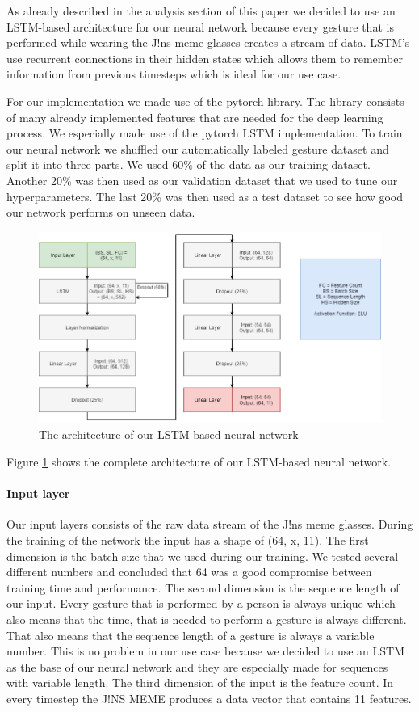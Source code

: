 \documentclass[runningheads]{llncs}
\begin{document}
As already described in the analysis section of this paper we decided to use an LSTM-based architecture for our neural network because every gesture that is performed while wearing the J!ns meme glasses creates a stream of data. LSTM's use recurrent connections in their hidden states which allows them to remember information from previous timesteps which is ideal for our use case.
\par
For our implementation we made use of the pytorch library. The library consists of many already implemented features that are needed for the deep learning process. We especially made use of the pytorch LSTM implementation. To train our neural network we shuffled our automatically labeled gesture dataset and split it into three parts. We used 60\% of the data as our training dataset. Another 20\% was then used as our validation dataset that we used to tune our hyperparameters. The last 20\% was then used as a test dataset to see how good our network performs on unseen data.
\begin{figure}
\centering
\includegraphics[width=\textwidth]{LSTM_Architecture.png}
\caption{The architecture of our LSTM-based neural network}
\label{fig:lstmarchitecture}
\end{figure}
Figure \ref{fig:lstmarchitecture} shows the complete architecture of our LSTM-based neural network.
\paragraph{Input layer}
Our input layers consists of the raw data stream of the J!ns meme glasses. During the training of the network the input has a shape of (64, x, 11). The first dimension is the batch size that we used during our training. We tested several different numbers and concluded that 64 was a good compromise between training time and performance. The second dimension is the sequence length of our input. Every gesture that is performed by a person is always unique which also means that the time, that is needed to perform a gesture is always different. That also means that the sequence length of a gesture is always a variable number. This is no problem in our use case because we decided to use an LSTM as the base of our neural network and they are especially made for sequences with variable length. The third dimension of the input is the feature count. In every timestep the J!NS MEME produces a data vector that contains 11 features.
\end{document}
